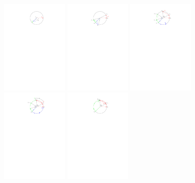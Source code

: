 \documentclass[11pt]{article}
\begin{document}
\includegraphics[width=0.25\textwidth]{Q2S1_Eq/eq_1.pdf}
\hfill
\includegraphics[width=0.25\textwidth]{Q2S1_Eq/eq_2.pdf}
\hfill
\includegraphics[width=0.25\textwidth]{Q2S1_Eq/eq_3.pdf}
\includegraphics[width=0.25\textwidth]{Q2S1_Eq/eq_4.pdf}
\includegraphics[width=0.25\textwidth]{Q2S1_Eq/lb_1.pdf}
\end{document}
